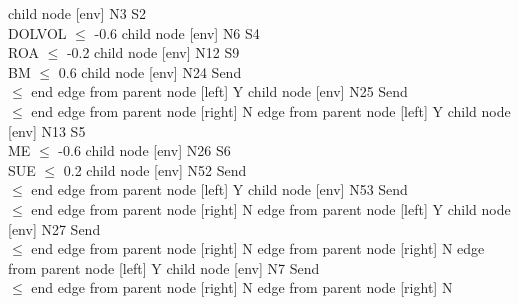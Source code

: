       child { node [env] {N3  S2 \\ DOLVOL $\leq$ -0.6} 
            child { node [env] {N6  S4 \\ ROA $\leq$ -0.2} 
                  child { node [env] {N12  S9 \\ BM $\leq$ 0.6} 
                        child { node [env] {N24  Send \\  $\leq$ end} 
                              edge from parent node [left] {Y} 
                        }
                        child { node [env] {N25  Send \\  $\leq$ end} 
                              edge from parent node [right] {N} 
                        }
                        edge from parent node [left] {Y} 
                  }
                  child { node [env] {N13  S5 \\ ME $\leq$ -0.6} 
                        child { node [env] {N26  S6 \\ SUE $\leq$ 0.2} 
                              child { node [env] {N52  Send \\  $\leq$ end} 
                                    edge from parent node [left] {Y} 
                              }
                              child { node [env] {N53  Send \\  $\leq$ end} 
                                    edge from parent node [right] {N} 
                              }
                              edge from parent node [left] {Y} 
                        }
                        child { node [env] {N27  Send \\  $\leq$ end} 
                              edge from parent node [right] {N} 
                        }
                        edge from parent node [right] {N} 
                  }
                  edge from parent node [left] {Y} 
            }
            child { node [env] {N7  Send \\  $\leq$ end} 
                  edge from parent node [right] {N} 
            }
            edge from parent node [right] {N} 
      }

